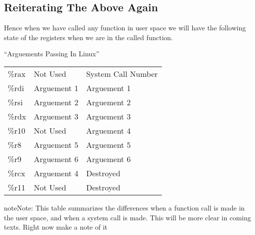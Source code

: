 \documentclass[letterpaper,10pt,english]{sphinxmanual}
\begin{document}
\subsection{Reiterating The Above Again}
\label{\detokenize{05_calling_system_calls:reiterating-the-above-again}}
Hence when we have called any function in user space we will have the following
state of the registers when we are in the called function.


\begin{threeparttable}
\capstart\caption{``Arguements Passing In Linux''}\label{\detokenize{05_calling_system_calls:id1}}
\noindent\begin{tabulary}{\linewidth}{|L|L|L|}
\hline
{}\relax &\relax &\relax \\
\hline
\%rax
&
Not Used
&
System Call Number
\\
\hline
\%rdi
&
Arguement 1
&
Arguement 1
\\
\hline
\%rsi
&
Arguement 2
&
Arguement 2
\\
\hline
\%rdx
&
Arguement 3
&
Arguement 3
\\
\hline
\%r10
&
Not Used
&
Arguement 4
\\
\hline
\%r8
&
Arguement 5
&
Arguement 5
\\
\hline
\%r9
&
Arguement 6
&
Arguement 6
\\
\hline
\%rcx
&
Arguement 4
&
Destroyed
\\
\hline
\%r11
&
Not Used
&
Destroyed
\\
\hline\end{tabulary}

\end{threeparttable}


\begin{sphinxadmonition}{note}{Note:}
This table summarizes the differences when a function call is made in the user space, and when a system call is made.
This will be more clear in coming texts. Right now make a note of it
\end{sphinxadmonition}
\end{document}
